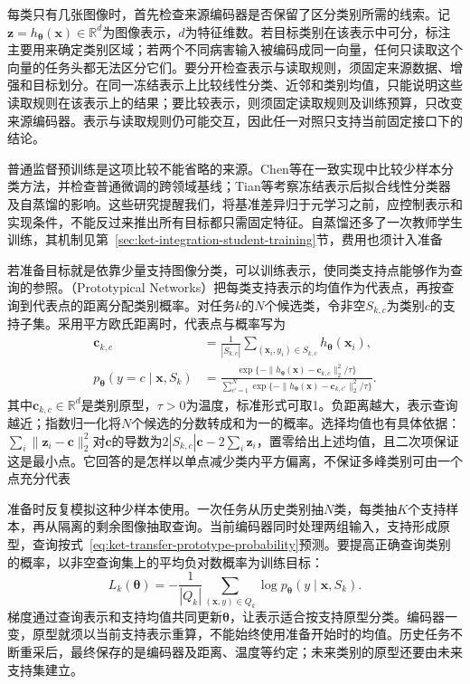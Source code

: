 每类只有几张图像时，首先检查来源编码器是否保留了区分类别所需的线索。记$\bm z=h_{\bm\theta}(\bm x)\in\mathbb R^d$为图像表示，$d$为特征维数。若目标类别在该表示中可分，标注主要用来确定类别区域；若两个不同病害输入被编码成同一向量，任何只读取这个向量的任务头都无法区分它们。要分开检查表示与读取规则，须固定来源数据、增强和目标划分。在同一冻结表示上比较线性分类、近邻和类别均值，只能说明这些读取规则在该表示上的结果；要比较表示，则须固定读取规则及训练预算，只改变来源编码器。表示与读取规则仍可能交互，因此任一对照只支持当前固定接口下的结论。

普通监督预训练是这项比较不能省略的来源。Chen等在一致实现中比较少样本分类方法，并检查普通微调的跨领域基线；Tian等考察冻结表示后拟合线性分类器及自蒸馏的影响。这些研究提醒我们，将基准差异归于元学习之前，应控制表示和实现条件，不能反过来推出所有目标都只需固定特征。自蒸馏还多了一次教师学生训练，其机制见第~\ref{sec:ket-integration-student-training}节，费用也须计入准备

若准备目标就是依靠少量支持图像分类，可以训练表示，使同类支持点能够作为查询的参照。（Prototypical Networks）把每类支持表示的均值作为代表点，再按查询到代表点的距离分配类别概率。对任务$k$的$N$个候选类，令非空$S_{k,c}$为类别$c$的支持子集。采用平方欧氏距离时，代表点与概率写为
\begin{align}
  \bm c_{k,c}
  &=\frac{1}{|S_{k,c}|}
    \sum_{(\bm x_i,y_i)\in S_{k,c}}h_{\bm{\theta}}(\bm x_i),
    \label{eq:ket-transfer-prototype}\\
  p_{\bm{\theta}}(y=c\mid\bm x,S_k)
  &=\frac{\exp\{-\|h_{\bm{\theta}}(\bm x)-\bm c_{k,c}\|_2^2/\tau\}}
    {\sum_{c'=1}^{N}\exp\{-\|h_{\bm{\theta}}(\bm x)-\bm c_{k,c'}\|_2^2/\tau\}}.
    \label{eq:ket-transfer-prototype-probability}
\end{align}
其中$\bm c_{k,c}\in\mathbb R^d$是类别原型，$\tau>0$为温度，标准形式可取1。负距离越大，表示查询越近；指数归一化将$N$个候选的分数转成和为一的概率。选择均值也有具体依据：$\sum_i\|\bm z_i-\bm c\|_2^2$对$\bm c$的导数为$2|S_{k,c}|\bm c-2\sum_i\bm z_i$，置零给出上述均值，且二次项保证这是最小点。它回答的是怎样以单点减少类内平方偏离，不保证多峰类别可由一个点充分代表

准备时反复模拟这种少样本使用。一次任务从历史类别抽$N$类，每类抽$K$个支持样本，再从隔离的剩余图像抽取查询。当前编码器同时处理两组输入，支持形成原型，查询按式~\eqref{eq:ket-transfer-prototype-probability}预测。要提高正确查询类别的概率，以非空查询集上的平均负对数概率为训练目标：
\begin{equation}
  L_k(\bm{\theta})
  =-\frac{1}{|Q_k|}\sum_{(\bm x,y)\in Q_k}
  \log p_{\bm{\theta}}(y\mid\bm x,S_k).
  \label{eq:ket-transfer-episodic-loss}
\end{equation}
梯度通过查询表示和支持均值共同更新$\bm\theta$，让表示适合按支持原型分类。编码器一变，原型就须以当前支持表示重算，不能始终使用准备开始时的均值。历史任务不断重采后，最终保存的是编码器及距离、温度等约定；未来类别的原型还要由未来支持集建立。


